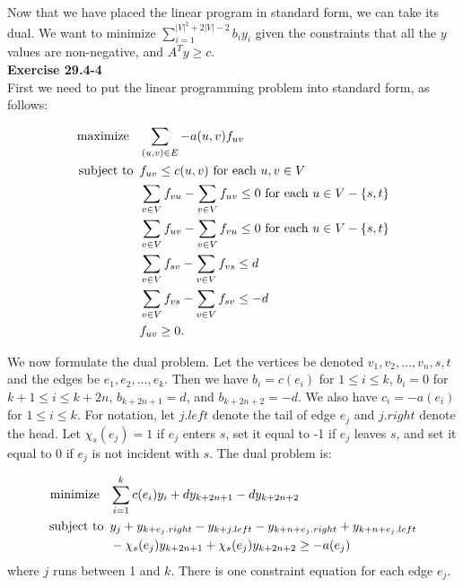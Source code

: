\documentclass{article}
\begin{document}
Now that we have placed the linear program in standard form, we can take its dual. We want to minimize $\sum_{i=1}^{|V|^2+2|V|-2} b_i y_i$ given the constraints that all the $y$ values are non-negative, and $A^T y \ge c$.\\

\noindent\textbf{Exercise 29.4-4}\\

First we need to put the linear programming problem into standard form, as follows:

\begin{align*}
\mbox{maximize \,\,\,} & \sum_{(u,v) \in E} -a(u,v)f_{uv}\\
\mbox{subject to \,} & f_{uv} \leq c(u,v) \mbox{ for each } u,v \in V \\
& \sum_{v \in V} f_{vu} - \sum_{v \in V} f_{uv} \leq 0 \mbox{ for each } u \in V - \{s,t\} \\
& \sum_{v \in V} f_{uv} - \sum_{v \in V} f_{vu} \leq 0 \mbox{ for each } u \in V - \{s,t\} \\
& \sum_{v \in V} f_{sv} - \sum_{v \in V} f_{vs} \leq d \\
& \sum_{v \in V} f_{vs} - \sum_{v \in V} f_{sv} \leq -d \\ 
& f_{uv} \geq 0.\\
\end{align*}

We now formulate the dual problem.  Let the vertices be denoted $v_1, v_2, \ldots, v_n, s, t$ and the edges be $e_1, e_2, \ldots, e_k$.  Then we have $b_i = c(e_i)$ for $1 \leq i \leq k$, $b_i = 0$ for $k+1 \leq i \leq k+2n$, $b_{k+2n+1} = d$, and $b_{k+2n+2} = -d$. We also have $c_i = -a(e_i)$ for $1 \leq i \leq k$.  For notation, let $j.left$ denote the tail of edge $e_j$ and $j.right$ denote the head.  Let $\chi_s(e_j) = 1$ if $e_j$ enters $s$, set it equal to -1 if $e_j$ leaves $s$, and set it equal to $0$ if $e_j$ is not incident with $s$.  The dual problem is:

\begin{align*}
\mbox{minimize \,\,\,} & \sum_{i=1}^k c(e_i)y_i + dy_{k+2n+1} - dy_{k+2n+2}\\
\mbox{subject to \,} & y_j + y_{k+e_j.right} - y_{k+j.left} - y_{k+n+e_j.right} + y_{k + n + e_j.left} \\
& - \chi_s(e_j)y_{k+2n+1} + \chi_s(e_j) y_{k+2n+2} \geq -a(e_j)
\end{align*}
where $j$ runs between 1 and $k$.  There is one constraint equation for each edge $e_j$. \\
\end{document}
